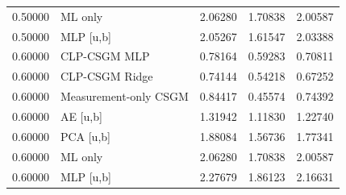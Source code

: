 \begin{tabular}{rlrrr}
0.50000 & ML only & 2.06280 & 1.70838 & 2.00587 \\
0.50000 & MLP [u,b] & 2.05267 & 1.61547 & 2.03388 \\
0.60000 & CLP-CSGM MLP & 0.78164 & 0.59283 & 0.70811 \\
0.60000 & CLP-CSGM Ridge & 0.74144 & 0.54218 & 0.67252 \\
0.60000 & Measurement-only CSGM & 0.84417 & 0.45574 & 0.74392 \\
0.60000 & AE [u,b] & 1.31942 & 1.11830 & 1.22740 \\
0.60000 & PCA [u,b] & 1.88084 & 1.56736 & 1.77341 \\
0.60000 & ML only & 2.06280 & 1.70838 & 2.00587 \\
0.60000 & MLP [u,b] & 2.27679 & 1.86123 & 2.16631 \\
\bottomrule
\end{tabular}
